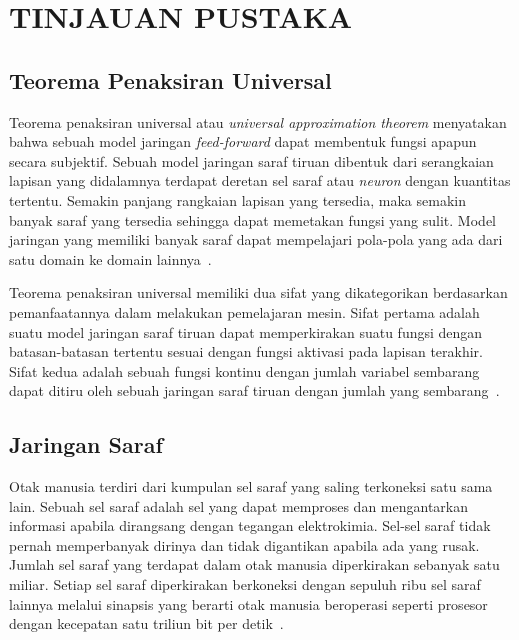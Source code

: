 

\chapter{TINJAUAN PUSTAKA}
\label{cha:2-TinjauanPustaka}

\section{Teorema Penaksiran Universal}
\label{sec:2-TeoremaPenaksiranUniversal}

Teorema penaksiran universal atau \textit{universal approximation theorem} menyatakan bahwa sebuah
model jaringan \textit{feed-forward} dapat membentuk fungsi apapun secara subjektif. Sebuah model
jaringan saraf tiruan dibentuk dari serangkaian lapisan yang didalamnya terdapat deretan sel saraf
atau \textit{neuron} dengan kuantitas tertentu. Semakin panjang rangkaian lapisan yang tersedia,
maka semakin banyak saraf yang tersedia sehingga dapat memetakan fungsi yang sulit.
Model jaringan yang memiliki banyak saraf dapat mempelajari pola-pola yang ada dari satu
domain ke domain lainnya~\cite{2016arXiv160100013G}.

Teorema penaksiran universal memiliki dua sifat yang dikategorikan berdasarkan pemanfaatannya dalam
melakukan pemelajaran mesin. Sifat pertama adalah suatu model jaringan saraf tiruan dapat
memperkirakan suatu fungsi dengan batasan-batasan tertentu sesuai dengan fungsi aktivasi pada
lapisan terakhir. Sifat kedua adalah sebuah fungsi kontinu dengan jumlah variabel sembarang dapat
ditiru oleh sebuah jaringan saraf tiruan dengan jumlah yang sembarang~\cite{2019arXiv191003344K}.

\section{Jaringan Saraf}
\label{sec:2-JaringanSaraf}

Otak manusia terdiri dari kumpulan sel saraf yang saling terkoneksi satu sama lain. Sebuah sel saraf
adalah sel yang dapat memproses dan mengantarkan informasi apabila dirangsang dengan tegangan
elektrokimia. Sel-sel saraf tidak pernah memperbanyak dirinya dan tidak digantikan apabila ada yang
rusak. Jumlah sel saraf yang terdapat dalam otak manusia diperkirakan sebanyak satu miliar. Setiap
sel saraf diperkirakan berkoneksi dengan sepuluh ribu sel saraf lainnya melalui sinapsis yang
berarti otak manusia beroperasi seperti prosesor dengan kecepatan satu triliun bit per
detik~\cite{10.3389/neuro.09.031.2009}.

